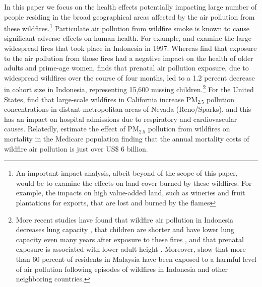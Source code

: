\documentclass[11pt]{article}
\begin{document}
\begin{spacing}{1.5}
In this paper we focus on the health effects potentially impacting large number of people residing in the broad geographical areas affected by the air pollution from these wildfires.\footnote{An important impact analysis, albeit beyond of the scope of this paper, would be to examine the effects on land cover burned by these wildfires. For example, the impacts on high value-added land, such as wineries and fruit plantations for exports, that are lost and burned by the flames} Particulate air pollution from wildfire smoke is known to cause significant adverse effects on human health. For example, \cite{frankenberg2005health} and \cite{jayachandran2009air} examine the large widespread fires that took place in Indonesia in 1997. Whereas \cite{frankenberg2005health} find that exposure to the air pollution from those fires had a negative  impact on the health of older adults and prime-age women, \cite{jayachandran2009air} finds that prenatal air pollution exposure, due to widespread wildfires over the course of four months, led to a 1.2 percent decrease in cohort size in Indonesia, representing 15,600 missing children.\footnote{More recent studies have found that wildfire air pollution in Indonesia decreases lung capacity \citep{Pakhtigian2020where}, that children are shorter and have lower lung capacity even many years after exposure to these fires \citep{rosales2019persistent}, and that prenatal exposure is associated with lower adult height \citep{tan2019seeking}. Moreover, \cite{mead2018impact} show that more than 60 percent of residents in Malaysia have been exposed to a harmful level of air pollution following episodes of wildfires in Indonesia and other neighboring countries.} For the United States, \cite{moeltner2013wildfire} find that large-scale wildfires in California increase PM$_{2.5}$ pollution concentrations in distant metropolitan areas of Nevada (Reno/Sparks), and this has an impact on hospital admissions due to respiratory and cardiovascular causes. Relatedly, \cite{miller2017blowing}  estimate the effect of PM$_{2.5}$ pollution from wildfires on mortality in the Medicare population finding that the annual mortality costs of wildfire air pollution is just over US\$ 6 billion.%


\end{spacing}
\end{document}
